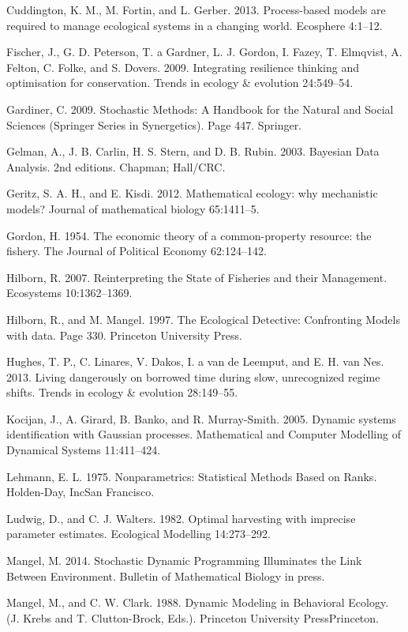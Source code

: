 \documentclass[]{components/elsarticle}
\begin{document}
Cuddington, K. M., M. Fortin, and L. Gerber. 2013. Process-based models
are required to manage ecological systems in a changing world. Ecosphere
4:1--12.

Fischer, J., G. D. Peterson, T. a Gardner, L. J. Gordon, I. Fazey, T.
Elmqvist, A. Felton, C. Folke, and S. Dovers. 2009. Integrating
resilience thinking and optimisation for conservation. Trends in ecology
\& evolution 24:549--54.

Gardiner, C. 2009. Stochastic Methods: A Handbook for the Natural and
Social Sciences (Springer Series in Synergetics). Page 447. Springer.

Gelman, A., J. B. Carlin, H. S. Stern, and D. B. Rubin. 2003. Bayesian
Data Analysis. 2nd editions. Chapman; Hall/CRC.

Geritz, S. A. H., and E. Kisdi. 2012. Mathematical ecology: why
mechanistic models? Journal of mathematical biology 65:1411--5.

Gordon, H. 1954. The economic theory of a common-property resource: the
fishery. The Journal of Political Economy 62:124--142.

Hilborn, R. 2007. Reinterpreting the State of Fisheries and their
Management. Ecosystems 10:1362--1369.

Hilborn, R., and M. Mangel. 1997. The Ecological Detective: Confronting
Models with data. Page 330. Princeton University Press.

Hughes, T. P., C. Linares, V. Dakos, I. a van de Leemput, and E. H. van
Nes. 2013. Living dangerously on borrowed time during slow, unrecognized
regime shifts. Trends in ecology \& evolution 28:149--55.

Kocijan, J., A. Girard, B. Banko, and R. Murray-Smith. 2005. Dynamic
systems identification with Gaussian processes. Mathematical and
Computer Modelling of Dynamical Systems 11:411--424.

Lehmann, E. L. 1975. Nonparametrics: Statistical Methods Based on Ranks.
Holden-Day, IncSan Francisco.

Ludwig, D., and C. J. Walters. 1982. Optimal harvesting with imprecise
parameter estimates. Ecological Modelling 14:273--292.

Mangel, M. 2014. Stochastic Dynamic Programming Illuminates the Link
Between Environment. Bulletin of Mathematical Biology in press.

Mangel, M., and C. W. Clark. 1988. Dynamic Modeling in Behavioral
Ecology. (J. Krebs and T. Clutton-Brock, Eds.). Princeton University
PressPrinceton.
\end{document}
